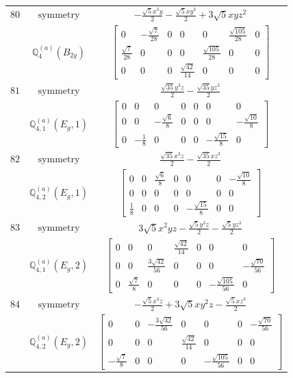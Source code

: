 \documentclass[fleqn,8pt,landscape]{jsarticle}
\begin{document}
\begin{longtable}{ccc}
$ 80 $ & $ \text{symmetry} $ & $ - \frac{\sqrt{5} x^{3} y}{2} - \frac{\sqrt{5} x y^{3}}{2} + 3 \sqrt{5} x y z^{2} $ \\
$  $ & $ \mathbb{Q}_{4}^{(a)}(B_{2g}) $ & $ \begin{bmatrix} 0 & - \frac{\sqrt{7}}{28} & 0 & 0 & 0 & \frac{\sqrt{105}}{28} & 0 \\ \frac{\sqrt{7}}{28} & 0 & 0 & 0 & \frac{\sqrt{105}}{28} & 0 & 0 \\ 0 & 0 & 0 & \frac{\sqrt{42}}{14} & 0 & 0 & 0 \end{bmatrix} $ \\ \hline
$ 81 $ & $ \text{symmetry} $ & $ \frac{\sqrt{35} y^{3} z}{2} - \frac{\sqrt{35} y z^{3}}{2} $ \\
$  $ & $ \mathbb{Q}_{4,1}^{(a)}(E_{g},1) $ & $ \begin{bmatrix} 0 & 0 & 0 & 0 & 0 & 0 & 0 \\ 0 & 0 & - \frac{\sqrt{6}}{8} & 0 & 0 & 0 & - \frac{\sqrt{10}}{8} \\ 0 & - \frac{1}{8} & 0 & 0 & 0 & - \frac{\sqrt{15}}{8} & 0 \end{bmatrix} $ \\ \hline
$ 82 $ & $ \text{symmetry} $ & $ \frac{\sqrt{35} x^{3} z}{2} - \frac{\sqrt{35} x z^{3}}{2} $ \\
$  $ & $ \mathbb{Q}_{4,2}^{(a)}(E_{g},1) $ & $ \begin{bmatrix} 0 & 0 & \frac{\sqrt{6}}{8} & 0 & 0 & 0 & - \frac{\sqrt{10}}{8} \\ 0 & 0 & 0 & 0 & 0 & 0 & 0 \\ \frac{1}{8} & 0 & 0 & 0 & - \frac{\sqrt{15}}{8} & 0 & 0 \end{bmatrix} $ \\ \hline
$ 83 $ & $ \text{symmetry} $ & $ 3 \sqrt{5} x^{2} y z - \frac{\sqrt{5} y^{3} z}{2} - \frac{\sqrt{5} y z^{3}}{2} $ \\
$  $ & $ \mathbb{Q}_{4,1}^{(a)}(E_{g},2) $ & $ \begin{bmatrix} 0 & 0 & 0 & \frac{\sqrt{42}}{14} & 0 & 0 & 0 \\ 0 & 0 & \frac{3 \sqrt{42}}{56} & 0 & 0 & 0 & - \frac{\sqrt{70}}{56} \\ 0 & \frac{\sqrt{7}}{8} & 0 & 0 & 0 & - \frac{\sqrt{105}}{56} & 0 \end{bmatrix} $ \\ \hline
$ 84 $ & $ \text{symmetry} $ & $ - \frac{\sqrt{5} x^{3} z}{2} + 3 \sqrt{5} x y^{2} z - \frac{\sqrt{5} x z^{3}}{2} $ \\
$  $ & $ \mathbb{Q}_{4,2}^{(a)}(E_{g},2) $ & $ \begin{bmatrix} 0 & 0 & - \frac{3 \sqrt{42}}{56} & 0 & 0 & 0 & - \frac{\sqrt{70}}{56} \\ 0 & 0 & 0 & \frac{\sqrt{42}}{14} & 0 & 0 & 0 \\ - \frac{\sqrt{7}}{8} & 0 & 0 & 0 & - \frac{\sqrt{105}}{56} & 0 & 0 \end{bmatrix} $ \\ \hline

\end{longtable}
\end{document}
